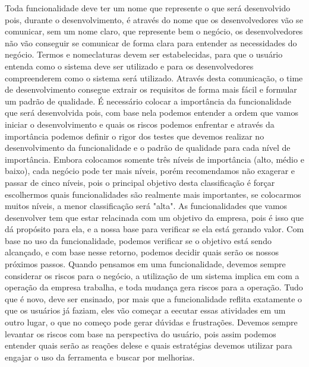     Toda funcionalidade deve ter um nome que represente o que será desenvolvido
    pois, durante o desenvolvimento, é através do nome que os desenvolvedores
    vão se comunicar, sem um nome claro, que represente bem o negócio, os
    desenvolvedores não vão conseguir se comunicar de forma clara para entender
    as necessidades do negócio. Termos e nomeclaturas devem ser estabelecidas,
    para que o usuário entenda como o sistema deve ser utilizado e para os
    desenvolvedores compreenderem como o sistema será utilizado. Através desta
    comunicação, o time de desenvolvimento consegue extrair os requisitos de forma
    mais fácil e formular um padrão de qualidade. \newline
    É necessário colocar a importância da funcionalidade que será desenvolvida pois,
    com base nela podemos entender a ordem que vamos iniciar o desenvolvimento
    e quais os riscos podemos enfrentar e através da importância podemos definir
    o rigor dos testes que devemos realizar no desenvolvimento da funcionalidade
    e o padrão de qualidade para cada nível de importância. Embora colocamos
    somente três níveis de importância (alto, médio e baixo), cada negócio pode
    ter mais níveis, porém recomendamos não exagerar e passar de cinco níveis,
    pois o principal objetivo desta classificação é forçar escolhermos quais
    funcionalidades são realmente mais importantes, se colocarmos muitos níveis,
    a menor classificação será "alta". \newline
    As funcionalidades que vamos desenvolver tem que estar relacinada com um
    objetivo da empresa, pois é isso que dá propósito para ela, e a nossa base
    para verificar se ela está gerando valor. Com base no uso da funcionalidade,
    podemos verificar se o objetivo está sendo alcançado, e com base nesse
    retorno, podemos decidir quais serão os nossos próximos passos. \newline
    Quando pensamos em uma funcionalidade, devemos sempre considerar os riscos
    para o negócio, a utilização de um sistema implica em com a operação da
    empresa trabalha, e toda mudança gera riscos para a operação. Tudo que é
    novo, deve ser ensinado, por mais que a funcionalidade reflita exatamente o
    que os usuários já faziam, eles vão começar a eecutar essas atividades em
    um outro lugar, o que no começo pode gerar dúvidas e frustrações. Devemos
    sempre levantar os riscos com base na perspectiva do usuário, pois assim
    podemos entender quais serão as reações delese e quais estratégias devemos
    utilizar para engajar o uso da ferramenta e buscar por melhorias. \newline
